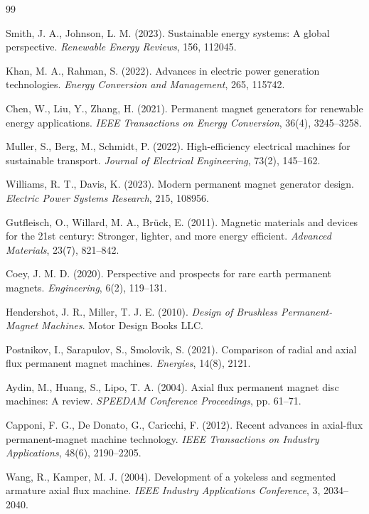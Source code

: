 \documentclass[12pt,a4paper]{article}
\begin{document}
\begin{thebibliography}{99}

Smith, J. A., Johnson, L. M. (2023). Sustainable energy systems: A global perspective. \textit{Renewable Energy Reviews}, 156, 112045.

Khan, M. A., Rahman, S. (2022). Advances in electric power generation technologies. \textit{Energy Conversion and Management}, 265, 115742.

Chen, W., Liu, Y., Zhang, H. (2021). Permanent magnet generators for renewable energy applications. \textit{IEEE Transactions on Energy Conversion}, 36(4), 3245--3258.

Muller, S., Berg, M., Schmidt, P. (2022). High-efficiency electrical machines for sustainable transport. \textit{Journal of Electrical Engineering}, 73(2), 145--162.

Williams, R. T., Davis, K. (2023). Modern permanent magnet generator design. \textit{Electric Power Systems Research}, 215, 108956.

Gutfleisch, O., Willard, M. A., Brück, E. (2011). Magnetic materials and devices for the 21st century: Stronger, lighter, and more energy efficient. \textit{Advanced Materials}, 23(7), 821--842.

Coey, J. M. D. (2020). Perspective and prospects for rare earth permanent magnets. \textit{Engineering}, 6(2), 119--131.

Hendershot, J. R., Miller, T. J. E. (2010). \textit{Design of Brushless Permanent-Magnet Machines}. Motor Design Books LLC.

Postnikov, I., Sarapulov, S., Smolovik, S. (2021). Comparison of radial and axial flux permanent magnet machines. \textit{Energies}, 14(8), 2121.

Aydin, M., Huang, S., Lipo, T. A. (2004). Axial flux permanent magnet disc machines: A review. \textit{SPEEDAM Conference Proceedings}, pp. 61--71.

Capponi, F. G., De Donato, G., Caricchi, F. (2012). Recent advances in axial-flux permanent-magnet machine technology. \textit{IEEE Transactions on Industry Applications}, 48(6), 2190--2205.

Wang, R., Kamper, M. J. (2004). Development of a yokeless and segmented armature axial flux machine. \textit{IEEE Industry Applications Conference}, 3, 2034--2040.


\end{thebibliography}
\end{document}
